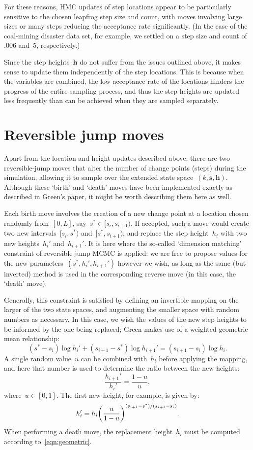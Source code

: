 \documentclass[11pt,a4paper]{article}
\newcommand\ub[1]{\symbf{#1}}                    %
\DeclarePairedDelimiter\lr{\lparen}{\rparen}     %
\theoremstyle{definition}
\begin{document}
For these reasons, HMC updates of step locations appear to be particularly
sensitive to the chosen leapfrog step size and count, with moves involving large
sizes or many steps reducing the acceptance rate significantly. (In the case of
the coal-mining disaster data set, for example, we settled on a step size and
count of~$.006$ and~$5$, respectively.)

Since the step heights~$\ub{h}$ do not suffer from the issues outlined above, it
makes sense to update them independently of the step locations. This is because
when the variables are combined, the low acceptance rate of the locations
hinders the progress of the entire sampling process, and thus the step heights
are updated less frequently than can be achieved when they are sampled
separately.

\section{Reversible jump moves} %

Apart from the location and height updates described above, there are two
reversible-jump moves that alter the number of change points (steps) during the
simulation, allowing it to sample over the extended state
space~$(k,\ub{s},\ub{h})$. Although these `birth' and `death' moves have been
implemented exactly as described in Green's paper, it might be worth describing
them here as well.

Each birth move involves the creation of a new change point at a location chosen
randomly from~$[0,L]$, say~$s^* \in [s_i, s_{i+1})$. If accepted, such a move
would create two new intervals~$[s_i, s^*)$ and~$[s^*, s_{i+1})$, and replace
the step height~$h_i$ with two new heights~$h_i'$ and~$h_{i+1}'$. It is here
where the so-called `dimension matching' constraint of reversible jump MCMC is
applied: we are free to propose values for the new parameters~$(s^*, h_i',
h_{i+1}')$ however we wish, as long as the same (but inverted) method is used in
the corresponding reverse move (in this case, the `death' move).

Generally, this constraint is satisfied by defining an invertible mapping on the
larger of the two state spaces, and augmenting the smaller space with random
numbers as necessary. In this case, we wish the values of the new step heights
to be informed by the one being replaced; Green makes use of a weighted
geometric mean relationship:
\begin{equation}\label{eqn:geometric}
  (s^* - s_i)\log h_i' + (s_{i+1} - s^*)\log h_{i+1}'
    = (s_{i+1} - s_i)\log h_i.
\end{equation}
A single random value~$u$ can be combined with~$h_i$ before applying the
mapping, and here that number is used to determine the ratio between the new
heights:
\[ \frac{h_{i+1}'}{h_i'} = \frac{1-u}{u}, \]
where~$u \in [0,1]$. The first new height, for example, is given by:
\[ h_i' = h_i \lr*{\frac{u}{1-u}}^{(s_{i+1}-s^*)/(s_{i+1}-s_i)}. \]
When performing a death move, the replacement height~$h_i$ must be computed
according to~\eqref{eqn:geometric}.
\end{document}
